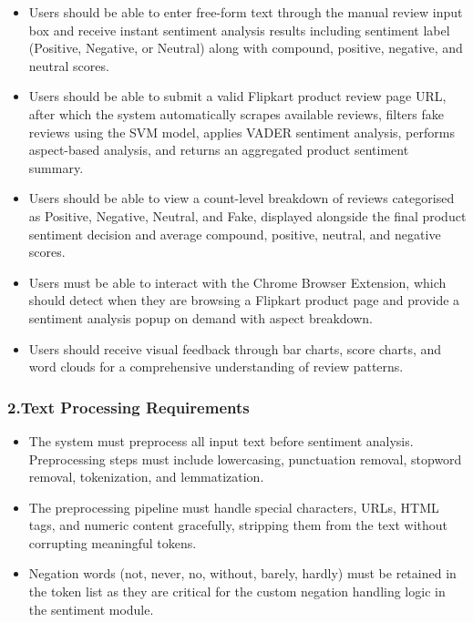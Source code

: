 \documentclass[12pt,a4paper]{report}
\begin{document}
\begin{itemize}
  \item Users should be able to enter free-form text through the manual review input box and receive instant sentiment analysis results including sentiment label (Positive, Negative, or Neutral) along with compound, positive, negative, and neutral scores.

  \item Users should be able to submit a valid Flipkart product review page URL, after which the system automatically scrapes available reviews, filters fake reviews using the SVM model, applies VADER sentiment analysis, performs aspect-based analysis, and returns an aggregated product sentiment summary.

  \item Users should be able to view a count-level breakdown of reviews categorised as Positive, Negative, Neutral, and Fake, displayed alongside the final product sentiment decision and average compound, positive, neutral, and negative scores.

  \item Users must be able to interact with the Chrome Browser Extension, which should detect when they are browsing a Flipkart product page and provide a sentiment analysis popup on demand with aspect breakdown.

  \item Users should receive visual feedback through bar charts, score charts, and word clouds for a comprehensive understanding of review patterns.
\end{itemize}

\subsubsection*{2.\quad Text Processing Requirements}

\begin{itemize}
  \item The system must preprocess all input text before sentiment analysis. Preprocessing steps must include lowercasing, punctuation removal, stopword removal, tokenization, and lemmatization.

  \item The preprocessing pipeline must handle special characters, URLs, HTML tags, and numeric content gracefully, stripping them from the text without corrupting meaningful tokens.

  \item Negation words (not, never, no, without, barely, hardly) must be retained in the token list as they are critical for the custom negation handling logic in the sentiment module.
\end{itemize}
\end{document}
